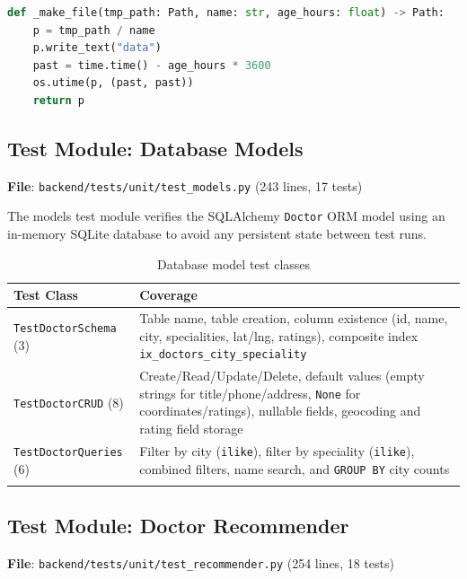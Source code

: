 \documentclass[12pt, a4paper]{article}
\newcommand{\file}[1]{\texttt{\color{accent}#1}}
\begin{document}
\begin{lstlisting}[language=Python, caption={File age back-dating helper}]
def _make_file(tmp_path: Path, name: str, age_hours: float) -> Path:
    p = tmp_path / name
    p.write_text("data")
    past = time.time() - age_hours * 3600
    os.utime(p, (past, past))
    return p
\end{lstlisting}

\subsection{Test Module: Database Models}
\label{sec:test_models}

\textbf{File}: \file{backend/tests/unit/test\_models.py} \quad (243 lines, 17 tests)

The models test module verifies the SQLAlchemy \texttt{Doctor} ORM model using
an in-memory SQLite database to avoid any persistent state between test runs.

\begin{longtable}{p{3.5cm} p{9.5cm}}
  \toprule
  \textbf{Test Class} & \textbf{Coverage} \\
  \midrule
  \texttt{TestDoctorSchema} (3)
    & Table name, table creation, column existence (id, name, city, specialities,
      lat/lng, ratings), composite index \texttt{ix\_doctors\_city\_speciality} \\[4pt]
  \texttt{TestDoctorCRUD} (8)
    & Create/Read/Update/Delete, default values (empty strings for title/phone/address,
      \texttt{None} for coordinates/ratings), nullable fields,
      geocoding and rating field storage \\[4pt]
  \texttt{TestDoctorQueries} (6)
    & Filter by city (\texttt{ilike}), filter by speciality (\texttt{ilike}),
      combined filters, name search, and \texttt{GROUP BY} city counts \\
  \bottomrule
  \caption{Database model test classes}
\end{longtable}

\subsection{Test Module: Doctor Recommender}
\label{sec:test_recommender}

\textbf{File}: \file{backend/tests/unit/test\_recommender.py} \quad (254 lines, 18 tests)
\end{document}
